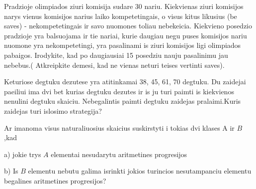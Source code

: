 \prob %
 Pradzioje olimpiados ziuri komisija sudare 30 nariu. Kiekvienas ziuri
komisijos narys vienus komisijos narius laiko kompetetingais, o visus
kitus likusius (be saves) - nekompetetingais ir savo nuomones toliau
nebekeicia. Kiekvieno posedzio pradzioje yra balsuojama ir tie nariai,
kurie daugiau negu puses komisijos nariu nuomone yra nekompetetingi,
yra pasalinami is ziuri komisijos ligi olimpiados pabaigos. Irodykite,
kad po daugiausiai 15 posedziu nauju pasalinimu jau nebebus.(
Atkreipkite demesi, kad ne vienas neturi teises vertinti saves). 
                               
                                                                      
                                      
                                                              
                                                          
                                                                  
     
                                           
                                                               
                         
                                                                  
                           




\prob %
Keturiose degtuku dezutese yra atitinkamai 38, 45, 61, 70 degtuku. Du
zaidejai paeiliui ima dvi bet kurias degtuku dezutes ir is ju turi
paimti  is kiekvienos nenulini  degtuku skaiciu. Nebegalintis paimti
degtuku zaidejas pralaimi.Kuris zaidejas turi islosimo strategija?                                   
                                                                      
                                                                      
                                             
            




\prob %
                                                               
Ar imanoma visus naturaliuosius skaicius suskirstyti i tokias dvi
klases A ir $B$ ,kad 
       
\item{a)} jokie trys $A$ elementai nesudarytu aritmetines progresijos
                       
\item{b)} Is $B$ elementu nebutu galima isrinkti jokios turincios
nesutampanciu elementu begalines aritmetines progresijos?


\bye

